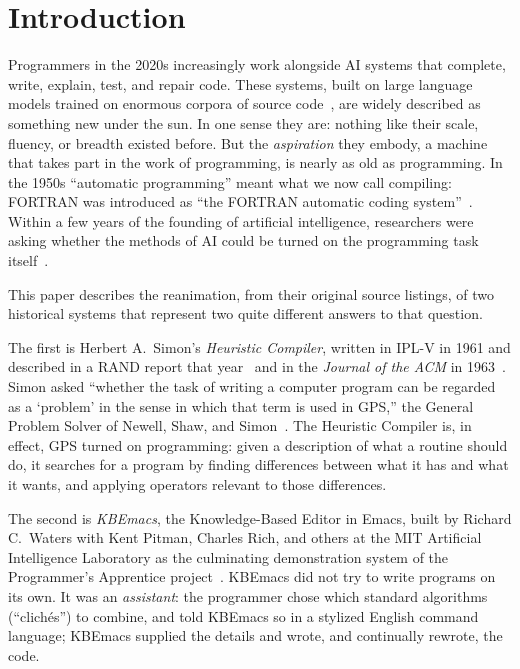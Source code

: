 \documentclass[11pt]{article}
\begin{document}
\section{Introduction}
\label{sec:intro}

Programmers in the 2020s increasingly work alongside AI systems that
complete, write, explain, test, and repair code. These systems, built
on large language models trained on enormous corpora of source
code~\cite{chen2021codex,jimenez2024swebench}, are widely described as
something new under the sun. In one sense they are: nothing like their
scale, fluency, or breadth existed before. But the \emph{aspiration}
they embody, a machine that takes part in the work of programming, is
nearly as old as programming. In the 1950s ``automatic programming''
meant what we now call compiling: FORTRAN was introduced as ``the
FORTRAN automatic coding system''~\cite{backus1957fortran}. Within a few
years of the founding of artificial intelligence, researchers were
asking whether the methods of AI could be turned on the programming
task itself~\cite{balzer1985,richwaters1988myths}.

This paper describes the reanimation, from their original source
listings, of two historical systems that represent two quite different
answers to that question.

The first is Herbert A.~Simon's \emph{Heuristic Compiler}, written in
IPL-V in 1961 and described in a RAND report that year~\cite{simonP2349}
and in the \textit{Journal of the ACM} in 1963~\cite{simon1963jacm}.
Simon asked ``whether the task of writing a computer program can be
regarded as a `problem' in the sense in which that term is used in
GPS,'' the General Problem Solver of Newell, Shaw, and
Simon~\cite{newell1959gps}. The Heuristic Compiler is, in effect, GPS
turned on programming: given a description of what a routine should do,
it searches for a program by finding differences between what it has
and what it wants, and applying operators relevant to those
differences.

The second is \emph{KBEmacs}, the Knowledge-Based Editor in Emacs,
built by Richard C.~Waters with Kent Pitman, Charles Rich, and others at
the MIT Artificial Intelligence Laboratory as the culminating
demonstration system of the Programmer's Apprentice
project~\cite{waters1985tr,waters1986aimag,richwaters1987overview}.
KBEmacs did not try to write programs on its own. It was an
\emph{assistant}: the programmer chose which standard algorithms
(``clich\'es'') to combine, and told KBEmacs so in a stylized English
command language; KBEmacs supplied the details and wrote, and
continually rewrote, the code.
\end{document}
